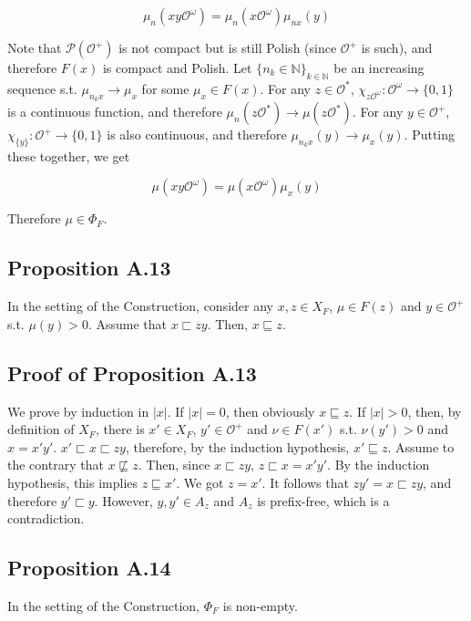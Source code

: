 \documentclass[a4paper]{article}
\newcommand{\Nats}{\mathbb{N}}
\newcommand{\Abs}[1]{\lvert #1 \rvert}
\newcommand{\Prob}{\mathcal{P}}
\newcommand{\Obs}{\mathcal{O}}
\newcommand{\ObsO}{\Obs^\omega}
\begin{document}
$$\mu_n(xy\ObsO) = \mu_n(x\ObsO) \mu_{nx}(y)$$

Note that ${\Prob(\Obs^+)}$ is not compact but is still Polish (since ${\Obs^+}$ is such), and therefore ${F(x)}$ is compact and Polish. Let ${\{n_k \in \Nats\}_{k \in \Nats}}$ be an increasing sequence s.t. ${\mu_{n_kx} \rightarrow \mu_x}$ for some ${\mu_x \in F(x)}$. For any ${z \in \Obs^*}$, ${\chi_{z\ObsO}: \ObsO \rightarrow \{0,1\}}$ is a continuous function, and therefore ${\mu_{n}(z\Obs^*) \rightarrow \mu(z\Obs^*)}$. For any ${y \in \Obs^+}$, ${\chi_{\{y\}}: \Obs^+ \rightarrow \{0,1\}}$ is also continuous, and therefore ${\mu_{n_k x}(y) \rightarrow \mu_x(y)}$. Putting these together, we get

$$\mu(xy\ObsO) = \mu(x\ObsO) \mu_{x}(y)$$

Therefore ${\mu \in \Phi_F}$.

\subsection{Proposition A.13}

In the setting of the Construction, consider any ${x,z \in X_F}$, ${\mu \in F(z)}$ and ${y \in \Obs^+}$ s.t. ${\mu(y) > 0}$. Assume that ${x \sqsubset zy}$. Then, ${x \sqsubseteq z}$.

\subsection{Proof of Proposition A.13}

We prove by induction in ${\Abs{x}}$. If ${\Abs{x}=0}$, then obviously ${x \sqsubseteq z}$. If ${\Abs{x} > 0}$, then, by definition of ${X_F}$, there is ${x' \in X_F}$, ${y' \in \Obs^+}$ and ${\nu \in F(x')}$ s.t. ${\nu(y') > 0}$ and ${x = x'y'}$. ${x' \sqsubset x \sqsubset zy}$, therefore, by the induction hypothesis, ${x' \sqsubseteq z}$. Assume to the contrary that ${x \not\sqsubseteq z}$. Then, since ${x \sqsubset zy}$, ${z \sqsubset x = x'y'}$. By the induction hypothesis, this implies ${z \sqsubseteq x'}$. We got ${z = x'}$. It follows that ${zy' = x \sqsubset zy}$, and therefore ${y' \sqsubset y}$. However, ${y,y' \in A_z}$ and ${A_z}$ is prefix-free, which is a contradiction.

\subsection{Proposition A.14}

In the setting of the Construction, ${\Phi_F}$ is non-empty.
\end{document}
